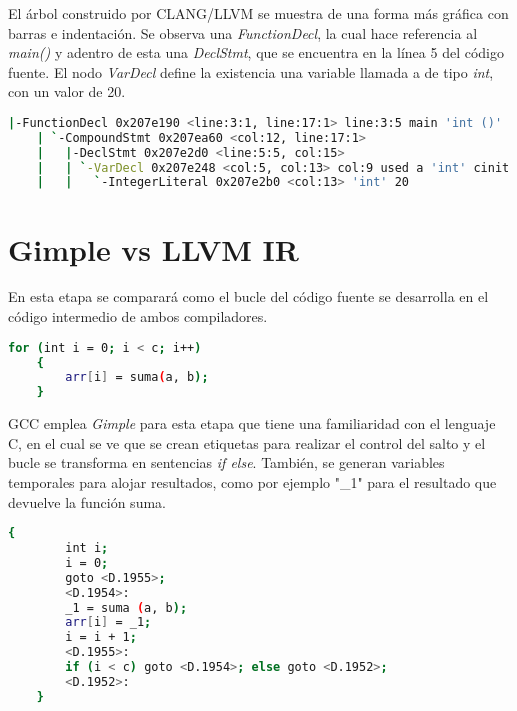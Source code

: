 El árbol construido por CLANG/LLVM se muestra de una forma más gráfica con barras e indentación. 
Se observa una \emph{FunctionDecl}, la cual hace referencia al \emph{main()} y adentro de esta una 
\emph{DeclStmt}, que se encuentra en la línea 5 del código fuente. El nodo \emph{VarDecl} 
define la existencia una variable llamada a de tipo \emph{int}, con un valor de 20.

\begin{lstlisting}[label=comandoC, caption= Fragmento del árbol de CLANG/LLVM del archivo ast. \cite{repositorio}, language=bash]
    |-FunctionDecl 0x207e190 <line:3:1, line:17:1> line:3:5 main 'int ()'
    | `-CompoundStmt 0x207ea60 <col:12, line:17:1>
    |   |-DeclStmt 0x207e2d0 <line:5:5, col:15>
    |   | `-VarDecl 0x207e248 <col:5, col:13> col:9 used a 'int' cinit
    |   |   `-IntegerLiteral 0x207e2b0 <col:13> 'int' 20   \end{lstlisting}


\section{Gimple vs LLVM IR}

En esta etapa se comparará como el bucle del código fuente se desarrolla en el código intermedio 
de ambos compiladores. 

\begin{lstlisting}[label=comandoC, caption= Fragmento del código fuente del archivo codigo-ejemplo.c. \cite{repositorio}, language=bash]
    for (int i = 0; i < c; i++)
    {
        arr[i] = suma(a, b);
    }   \end{lstlisting}

GCC emplea \emph{Gimple} para esta etapa que tiene una familiaridad con el lenguaje C, 
en el cual se ve que se crean etiquetas para realizar el control del salto 
y el bucle se transforma en sentencias \emph{if else}. También, se generan variables 
temporales para alojar resultados, como por ejemplo "\_1" para el resultado que 
devuelve la función suma.  

\begin{lstlisting}[label=comandoC, caption= Fragmento del \emph{Gimple} de GCC del archivo codigo-ejemplo.c.006t.gimple. \cite{repositorio}, language=bash]
    {
        int i;
        i = 0;
        goto <D.1955>;
        <D.1954>:
        _1 = suma (a, b);
        arr[i] = _1;
        i = i + 1;
        <D.1955>:
        if (i < c) goto <D.1954>; else goto <D.1952>;
        <D.1952>:
    } \end{lstlisting}

